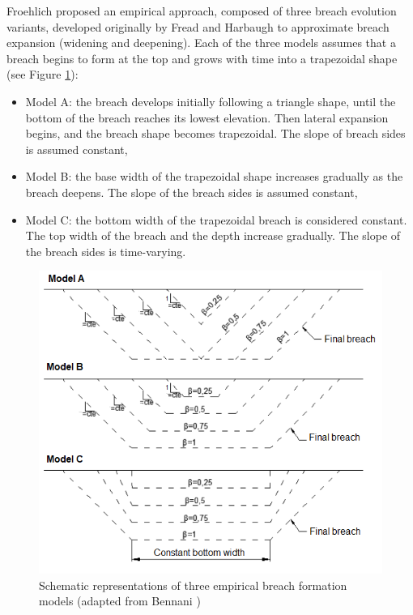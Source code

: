 Froehlich \cite{Froehlich2008} proposed an empirical approach, composed of three
breach evolution variants, developed originally by Fread and Harbaugh
\cite{Fread1973} to approximate breach expansion (widening and deepening).
Each of the three models assumes that a breach begins to form at the top and
grows with time into a trapezoidal shape (see Figure \ref{fig:froehlich}):
\begin{itemize}
\item Model A: the breach develops initially following a triangle shape, until
the bottom of the breach reaches its lowest elevation.
Then lateral expansion begins, and the breach shape becomes trapezoidal.
The slope of breach sides is assumed constant,
\item Model B: the base width of the trapezoidal shape increases gradually as
the breach deepens. The slope of the breach sides is assumed constant,
\item Model C: the bottom width of the trapezoidal breach is considered constant.
The top width of the breach and the depth increase gradually.
The slope of the breach sides is time-varying.
\end{itemize}
\begin{figure}
\centering
\includegraphics[width=\textwidth]{./graphics/bennani2016}
\caption{Schematic representations of three empirical breach formation models
(adapted from Bennani \cite{Bennani2016})}
\label{fig:froehlich}
\end{figure}
